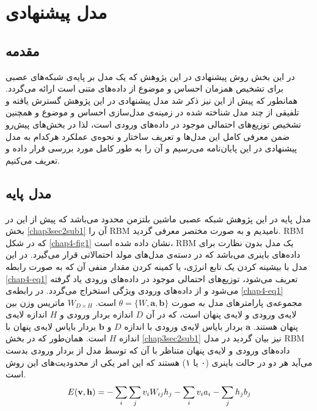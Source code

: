 \chapter{مدل پیشنهادی}
\thispagestyle{empty}
\section{مقدمه}
در این بخش روش پیشنهادی در این پژوهش که یک مدل بر پایه‌ی شبکه‌های عصبی برای تشخیص همزمان احساس و موضوع از داده‌های متنی است ارائه می‌‌گردد. همانطور که پیش از این نیز ذکر شد مدل پیشنهادی در این پژوهش گسترش یافته و تلفیقی از چند مدل شناخته شده در زمینه‌ی مدل‌سازی احساس و موضوع و همچنین تشخیص توزیع‌های احتمالی‌ موجود در داده‌های ورودی است، لذا در بخش‌های پیش‌ر‌‌و ضمن معرفی‌ کامل این مدل‌ها و تعریف ساختار و 
نحو‌ه‌ی عملکرد هرکدام به مدل پیشنهادی در این پایان‌‌نامه می‌‌رسیم و آن را به طور کامل مورد بررسی‌ قرار داده و تعریف می‌‌کنیم.

\section{مدل پایه}
\label{chap4sec2}
مدل پایه در این پژوهش  شبکه عصبی ماشین بلتزمن محدود می‌باشد که پیش از این در بخش
\ref{chap3sec2sub1}
 آن را
RBM
نامیدیم و به صورت مختصر معرفی‌ گردید.
RBM
که در شکل
\ref{chap4-fig1}
نشان داده شده است،
 RBM 
 یک مدل بدون نظارت برای داده‌های باینری می‌باشد که در دسته‌ی مدل‌های مولد احتمالاتی  قرار می‌گیرد. در این مدل با بیشینه کردن یک تابع انرژی، یا کمینه کردن مقدار منفی‌ آن که به صورت رابطه
\ref{chap4-eq1}
تعریف می‌‌شود، توزیع‌های احتمالی‌ موجود در داده‌های ورودی یاد گرفته می‌شود و از داده‌های ورودی ویژگی‌ استخراج می‌‌گردد. در رابطه‌ی
\ref{chap4-eq1}
مجموعه‌ی پارامترهای مدل به صورت
$\theta = \{W, \textbf{a}, \textbf{b}\}$
است.
$W_{D \times H}$
ماتریس وزن بین لایه‌ی ورودی و لایه‌ی پنهان است، که در آن
$D$
اندازه بردار ورودی و
$H$
اندازه لایه‌ی پنهان هستند.
$\textbf{a}$
بردار بایاس لایه‌ی ورودی با اندازه
$D$
و
$\textbf{b}$
بردار بایاس لایه‌ی پنهان با اندازه
$H$
 است. همان‌طور که در بخش 
 \ref{chap3sec2sub1}
نیز بیان گردید در مدل
 RBM
 داده‌های ورودی و لایه‌ی پنهان متناظر با آن که توسط مدل از بردار ورودی بدست می‌‌آید هر دو در حالت باینری (۰ یا ۱) هستند که این امر یکی‌ از محدودیت‌های این روش است.
\begin{align}
	\centering
	\label{chap4-eq1}
	E(\textbf{v},\textbf{h}) = -\sum_{i} \sum_{j} v_iW_{ij}h_j - \sum_i v_ia_i - \sum_j h_jb_j
\end{align}

